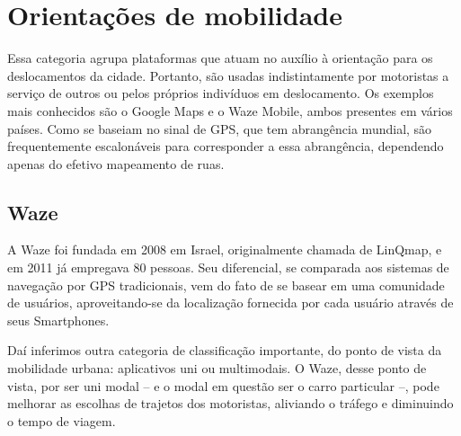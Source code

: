 \section{Orientações de mobilidade}

Essa categoria agrupa plataformas que atuam no auxílio à orientação para os deslocamentos da cidade. Portanto, são usadas indistintamente por motoristas a serviço de outros ou pelos próprios indivíduos em deslocamento. Os exemplos mais conhecidos são o Google Maps e o Waze Mobile, ambos presentes em vários países. Como se baseiam no sinal de GPS, que tem
abrangência mundial, são frequentemente escalonáveis para corresponder a essa abrangência,
dependendo apenas do efetivo mapeamento de ruas. \cite{caronae}


\subsection{Waze}

A Waze foi fundada em 2008 em Israel, originalmente chamada de LinQmap, e em 2011 já
empregava 80 pessoas. Seu diferencial, se comparada aos sistemas de navegação por GPS tradicionais, vem do fato de se basear em uma comunidade de usuários, aproveitando-se da localização fornecida por cada usuário através de seus Smartphones. 

Daí inferimos outra categoria de classificação importante, do ponto de vista da mobilidade
urbana: aplicativos uni ou multimodais. O Waze, desse ponto de vista, por ser uni modal – e o modal em questão ser o carro particular –, pode melhorar as escolhas de trajetos dos motoristas, aliviando o tráfego e diminuindo o tempo de viagem.


